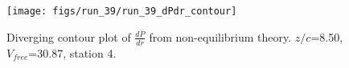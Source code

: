 \begin{figure}[H]
\centering
\texttt{[image: figs/run\_39/run\_39\_dPdr\_contour]}
\caption{Diverging contour plot of $\frac{d\bar{P}}{dr}$ from non-equilibrium theory. $z/c$=8.50, $V_{free}$=30.87, station 4.}
\label{fig:run_39_dPdr_contour}
\end{figure}


